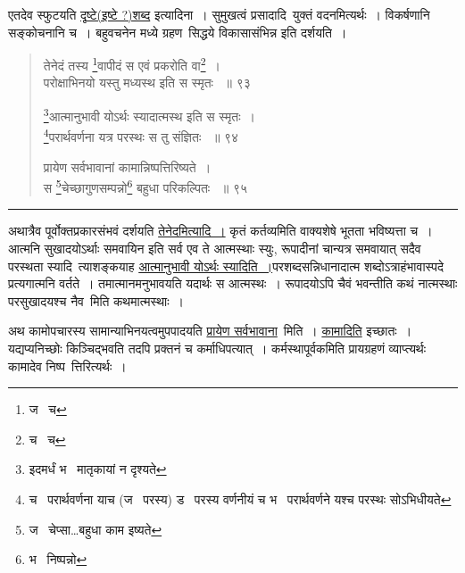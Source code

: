 \documentclass[11pt, openany]{book}
\begin{document}
{एतदेव स्फुटयति \underline{दृष्टे(इष्टे ?)शब्द} इत्यादिना~। सुमुखत्वं प्रसादादि\textendash\ युक्तं वदनमित्यर्थः~। विकर्षणानि सङ्कोचनानि च~। बहुवचनेन मध्ये ग्रहण\textendash\ सिद्धये विकासासंभिन्न इति दर्शयति~। 

\newpage

\begin{quote}
 {\na तेनेदं तस्य \renewcommand{\thefootnote}{1}\footnote{ज \textendash\ च }वापीदं स एवं प्रकरोति वा\renewcommand{\thefootnote}{2}\footnote{च \textendash\ च }~। \\
परोक्षाभिनयो यस्तु मध्यस्थ इति स स्मृतः ~॥ ९३ 

\renewcommand{\thefootnote}{3}\footnote{इदमर्धं भ \textendash\ मातृकायां न दृश्यते }आत्मानुभावी योऽर्थः स्यादात्मस्थ इति स स्मृतः~।\\ 
\renewcommand{\thefootnote}{4}\footnote{च \textendash\ परार्थवर्णना याच (ज \textendash\ परस्य) ड \textendash\ परस्य वर्णनीयं च भ \textendash\ परार्थवर्णने यश्च परस्थः सोऽभिधीयते}परार्थवर्णना यत्र परस्थः स तु संज्ञितः ~॥ ९४ 

प्रायेण सर्वभावानां कामान्निष्पत्तिरिष्यते~।\\ 
स \renewcommand{\thefootnote}{5}\footnote{ज \textendash\ चेप्सा\ldots बहुधा काम इष्यते}चेच्छागुणसम्पन्नो\renewcommand{\thefootnote}{6}\footnote{भ \textendash\ निष्पन्नो } बहुधा परिकल्पितः ~॥ ९५ }
\end{quote}

\hrule

\vspace{2mm}

अथात्रैव पूर्वोक्तप्रकारसंभवं दर्शयति \underline{तेनेदमित्यादि~।} कृतं कर्तव्यमिति वाक्यशेषे भूतता भविष्यत्ता च~। आत्मनि सुखादयोऽर्थाः समवायिन इति सर्व एव ते आत्मस्थाः स्युः, रूपादीनां चान्यत्र समवायात् सदैव परस्थता स्यादि\textendash\ त्याशङ्कयाह \underline{आत्मानुभावी योऽर्थः स्यादिति~।}परशब्दसन्निधानादात्म शब्दोऽत्राहंभावास्पदे प्रत्यगात्मनि वर्तते~। तमात्मानमनुभावयति यदार्थः स आत्मस्थः~। रूपादयोऽपि चैवं भवन्तीति कथं नात्मस्थाः परसुखादयश्च नैव\textendash\ मिति कथमात्मस्थाः~।\\

\begin{sloppypar}
अथ कामोपचारस्य सामान्याभिनयत्वमुपपादयति \underline{प्रायेण सर्वभावाना}\textendash\ मिति~। \underline{कामादिति} इच्छातः~। यद्यप्यनिच्छोः किञ्चिद्भवति तदपि प्रक्तनं च कर्माधिपत्यात्~। कर्मस्थापूर्वकमिति प्रायग्रहणं व्याप्त्यर्थः कामादेव निष्प\textendash\ त्तिरित्यर्थः~। \\
\end{sloppypar}

}
\end{document}
